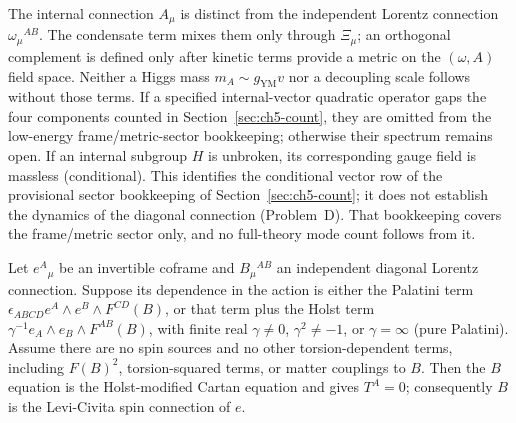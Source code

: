 The internal connection \(A_\mu\) is distinct from the independent
Lorentz connection \(\omega_\mu{}^{AB}\). The condensate term mixes
them only through \(\Xi_\mu\); an orthogonal complement is defined
only after kinetic terms provide a metric on the \((\omega,A)\)
field space. Neither a Higgs mass \(m_A\sim g_{\mathrm{YM}}v\) nor a
decoupling scale follows without those terms. If a specified
internal-vector quadratic operator gaps the four components counted
in Section~\ref{sec:ch5-count}, they are omitted from the low-energy
frame/metric-sector bookkeeping; otherwise their spectrum remains
open. If an internal subgroup \(H\) is unbroken, its corresponding
gauge field is massless (conditional). This identifies the
conditional vector row of the provisional sector bookkeeping of
Section~\ref{sec:ch5-count}; it does not establish the dynamics of
the diagonal connection (Problem~D). That bookkeeping covers the
frame/metric sector only, and no full-theory mode count follows
from it.

\begin{proposition}
  \label{prop:B-torsion-free}
  Let \(e^A{}_\mu\) be an invertible coframe and \(B_\mu{}^{AB}\) an
  independent diagonal Lorentz connection. Suppose its dependence in
  the action is either the Palatini term
  \(\epsilon_{ABCD}e^A\wedge e^B\wedge F^{CD}(B)\), or that term
  plus the Holst term
  \(\gamma^{-1}e_A\wedge e_B\wedge F^{AB}(B)\), with finite real
  \(\gamma\ne0\), \(\gamma^2\ne-1\), or \(\gamma=\infty\) (pure
  Palatini). Assume there are no spin sources and no other
  torsion-dependent terms, including \(F(B)^2\), torsion-squared
  terms, or matter couplings to \(B\). Then the \(B\) equation is
  the Holst-modified Cartan equation and gives \(T^A=0\);
  consequently \(B\) is the Levi-Civita spin connection of \(e\).
\end{proposition}

